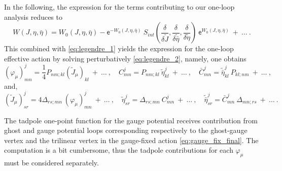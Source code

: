 \documentclass[11pt]{book}
\newcommand{\esf}{\mathsf{e}}
\theoremstyle{break}
\begin{document}
%
In the following, the expression for the terms contributing to our one-loop analysis reduces to
%
\begin{equation}
W(J,\eta,\bar\eta) = W_0(J,\eta,\bar\eta) - \esf^{-W_0(J,\eta,\bar\eta)} \ S_{int}\left(\frac{\delta}{\delta \widetilde J},\frac{\delta}{\delta\widetilde{\bar\eta}},\frac{\delta}{\delta\widetilde\eta}\right) \ \esf^{W_0(J,\eta,\bar\eta)} \ + \ \dots \ .
\label{1loopgeneric}
\end{equation}
%
This combined with \eqref{eq:legendre_1} yields the expression for the one-loop effective action by solving perturbatively \eqref{eq:legendre_2}, namely, one obtains
%
\begin{equation*}
(\varphi_\mu)^j_{mn} = \frac14 P_{nm;kl}(\widetilde J_\mu)_{kl} \ + \ \dots \ , \quad 
C^j_{mn} = P_{nm;kl} \ \widetilde{\eta}^j_{kl} \ + \ \dots \ , \quad  
\bar{C}^j_{mn} = \widetilde{\bar{\eta}}^j_{kl} \ P_{kl;nm} \ + \ \dots \ ,
\end{equation*}
%
and,
%
\begin{equation*}
(\widetilde J_\mu)^j_{sr} = 4 \Delta_{rs;mn} \ (\varphi_\mu)^j_{mn} \ + \ \dots \ , \quad
\widetilde{\eta}^j_{sr} = \Delta_{rs;mn} \ C^j_{mn} \ + \ \dots \ , \quad
\widetilde{\bar{\eta}}^j_{sr} = \bar{C}^j_{mn} \ \Delta_{mn;rs} \ + \ \dots \ .
\end{equation*}


The tadpole one-point function for the gauge potential receives contribution from ghost and gauge potential loops corresponding respectively to the ghost-gauge vertex and the trilinear vertex in the gauge-fixed action \eqref{eq:gauge_fix_final}. The computation is a bit cumbersome, thus the tadpole contributions for each $\varphi_\mu$ must be considered separately. 
\end{document}
